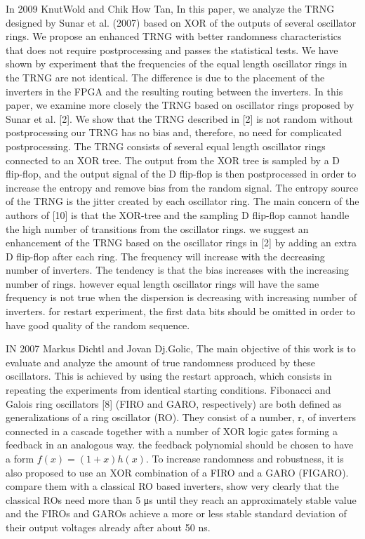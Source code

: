 In 2009 KnutWold and Chik How Tan, In this paper, we analyze the TRNG designed by Sunar et al. (2007) based on XOR of the outputs of several oscillator rings. We propose an enhanced TRNG with better randomness characteristics that does not require postprocessing and passes the statistical tests. We have shown by experiment that the frequencies of the equal length oscillator rings in the TRNG are not identical. The difference is due to the placement of the inverters in the FPGA and the resulting routing between the inverters. In this paper, we examine more closely the TRNG based on oscillator rings proposed by Sunar et al. [2]. We show that the TRNG described in [2] is not random without postprocessing our TRNG has no bias and, therefore, no need for complicated postprocessing. The TRNG consists of several equal length oscillator rings connected to an XOR tree. The output from the XOR tree is sampled by a D flip-flop, and the output signal of the D flip-flop is then postprocessed in order to increase the entropy and remove bias from the random signal. The entropy source of the TRNG is the jitter created by each oscillator ring. The main concern of the authors of [10] is that the XOR-tree and the sampling D flip-flop cannot handle the high number of transitions from the oscillator rings. we suggest an enhancement of the TRNG based on the oscillator rings in [2] by adding an extra D flip-flop after each ring. The frequency will increase with the decreasing number of inverters. The tendency is that the bias increases with the increasing number of rings. however equal length oscillator rings will have the same frequency is not true when the dispersion is decreasing with increasing number of inverters. for restart experiment, the first data bits should be omitted in order to have good quality of the random sequence.

IN 2007 Markus Dichtl and Jovan Dj.Golic, The main objective of this work is to evaluate and analyze the amount of true randomness produced by these oscillators. This is achieved by using the restart
approach, which consists in repeating the experiments from identical starting conditions. Fibonacci and Galois ring oscillators [8] (FIRO and GARO, respectively) are both defined as generalizations of a ring oscillator (RO). They consist of a number, r, of inverters connected in a cascade together with a number of XOR logic gates forming a feedback in an analogous way. the feedback polynomial should be chosen to have a form $f(x) = (1+x)h(x)$. To increase randomness and robustness, it is also proposed to use an
XOR combination of a FIRO and a GARO (FIGARO). compare them with a classical RO based inverters, show very clearly that the classical ROs need more than 5 μs until they reach an approximately stable value and the FIROs and GAROs achieve a more or less stable standard deviation of their output voltages already after about 50 ns. 

